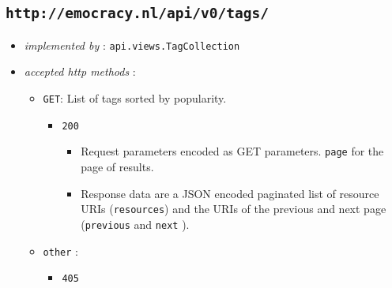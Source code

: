 \documentclass[a4paper]{report}
\begin{document}
\subsection{\texttt{http://emocracy.nl/api/v0/tags/}}
\begin{itemize}
    \item{\textsl{implemented by} : \texttt{api.views.TagCollection}}
    \item{\textsl{accepted http methods} :
        \begin{itemize}
            \item{\texttt{GET}: List of tags sorted by popularity.
                \begin{itemize}
                    \item{\texttt{200} 
                    \begin{itemize}
                        \item{Request parameters encoded as GET parameters. 
                        \texttt{page} for the page of results.}
                        \item{Response data are a JSON encoded paginated list of 
                        resource URIs (\texttt{resources}) and the URIs of the 
                        previous and next page (\texttt{previous} and \texttt{next}
                        ).}
                    \end{itemize}
                    }
                \end{itemize}
            }
            
            \item{\texttt{other} :
                \begin{itemize}
                    \item{\texttt{405}}
                \end{itemize}
            }
        \end{itemize}
    }
\end{itemize}
\end{document}

